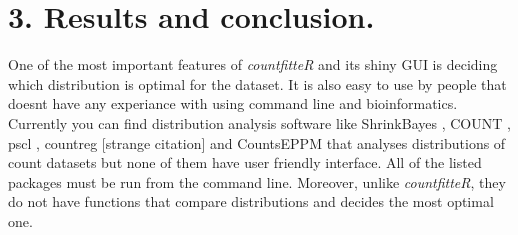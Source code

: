 % 
% 


\section{3. Results and conclusion.}

One of the most important features of \emph{countfitteR} and its shiny GUI is deciding which distribution is optimal for the dataset. It is also easy to use by people that doesnt have any experiance with using command line and bioinformatics. 
Currently you can find distribution analysis software like ShrinkBayes \citep{shrinkbayes}, COUNT \citep{hilbe_modeling_2014, hilbe_negative_2011-1}, pscl \citep{pscl}, countreg [strange citation] and CountsEPPM \citep{countseppm} that analyses distributions of count datasets but none of them have user friendly interface. All of the listed packages must be run from the command line. Moreover, unlike \emph{countfitteR}, they do not have functions that compare distributions and decides the most optimal one.



